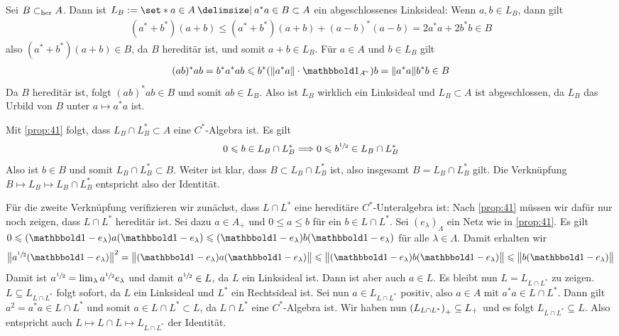 \begin{beweis}
	Sei $B \subher A$. Dann ist $L_B := \set*{a \in A \given a^*a \in B} \subset A$ ein abgeschlossenes Linksideal: Wenn $a,b \in L_B$, dann gilt
	\begin{align}
		(a^*+b^*)(a+b) \le (a^*+b^*)(a+b)+ (a-b)^*(a-b) = 2a^*a + 2b^*b \in B
	\end{align}
	also $(a^*+b^*)(a+b) \in B$, da $B$ hereditär ist, und somit $a+b \in L_B$. 
	Für $a \in A$ und $b \in L_B$ gilt
	\begin{align}
		(ab)^* ab = b^*a^* ab \le b^* \enbrace*{\norm*{a^*a}\cdot \ind_{A^\simm}} b = \norm*{a^*a} b^*b \in B
	\end{align}
	Da $B$ hereditär ist, folgt $(ab)^*ab \in B$ und somit $ab \in L_B$. 
	Also ist $L_B$ wirklich ein Linksideal und $L_B \subset A$ ist abgeschlossen, da $L_B$ das Urbild von $B$ unter $a \mapsto a^*a$ ist.
	
	Mit \autoref{prop:41} folgt, dass $L_B \cap L_B^* \subset A$ eine $C^*$-Algebra ist. Es gilt
	\[
		0 \le b \in L_B \cap L_B^* \Longrightarrow 0 \le b^{\sfrac{1}{2}} \in L_B \cap L_B^*
	\]  
	Also ist $b \in B$ und somit $L_B \cap L_B^* \subset B$. 
	Weiter ist klar, dass $B \subset L_B \cap L_B^*$ ist, also insgesamt $B=L_B \cap L_B^*$ gilt. 
	Die Verknüpfung $B \mapsto L_B \mapsto L_B \cap L_B^* $ entspricht also der Identität.
	
	Für die zweite Verknüpfung verifizieren wir zunächst, dass $L \cap L^*$ eine hereditäre $C^*$-Unteralgebra ist: 
	Nach \autoref{prop:41} müssen wir dafür nur noch zeigen, dass $L \cap L^*$ hereditär ist.
	Sei dazu $a \in A_+$ und $0 \le a \le b$ für ein $b \in L \cap L^*$. 
	Sei $(e_\lambda)_\Lambda$ ein Netz wie in \autoref{prop:41}. Es gilt
	\(
		0 \le (\ind-e_\lambda)a(\ind - e_\lambda) \le (\ind -e_\lambda) b (\ind -e_\lambda)
	\)
	für alle $\lambda \in \Lambda$. Damit erhalten wir
	\[
		\norm[\big]{a^{\sfrac{1}{2}}(\ind -e_\lambda)}^2= \norm[\big]{(\ind-e_\lambda)a(\ind -e_\lambda)} \le \norm[\big]{(\ind-e_\lambda)b(\ind -e_\lambda)} \le \norm[\big]{b(\ind -e_\lambda)}
	\]
	Damit ist $a^{\sfrac{1}{2}}=\lim_\lambda a^{\sfrac{1}{2}} e_\lambda$ und damit $a^{\sfrac{1}{2}} \in L$, da $L$ ein Linksideal ist. 
	Dann ist aber auch $a \in L$. Es bleibt nun $L= L_{L \cap L^*}$ zu zeigen.
	$L \subseteq L_{L \cap L^*}$ folgt sofort, da $L$ ein Linksideal und $L^*$ ein Rechtsideal ist.
	Sei nun $a \in L_{L \cap L^*}$ positiv, also $a \in A$ mit $a^*a \in L \cap L^*$.
	Dann gilt $a^2=a^*a \in L \cap L^*$ und somit $a \in L \cap L^* \subset L$, da $L \cap L^*$ eine $C^*$-Algebra ist.
	Wir haben nun $\enbrace*{L_{L \cap L^*}}_+ \subseteq L_+$ und es folgt $L_{L \cap L^*} \subseteq L$.
	Also entspricht auch $L \mapsto L \cap L \mapsto L_{L \cap L^*}$ der Identität.
\end{beweis}

